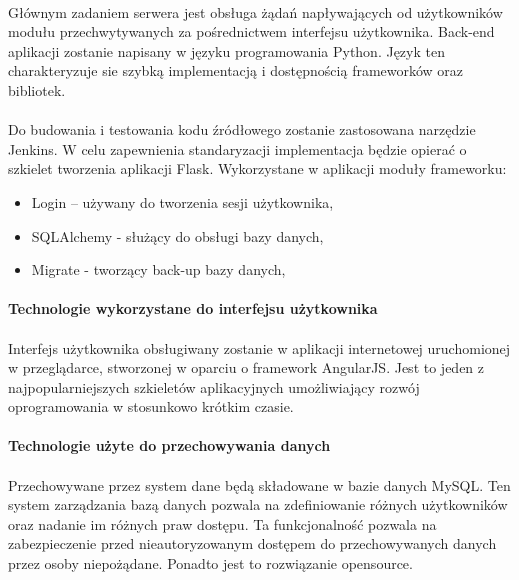\documentclass[11pt, a4paper, oneside]{report}
\begin{document}
	\paragraph{}
Głównym zadaniem serwera jest obsługa żądań napływających od użytkowników modułu przechwytywanych za pośrednictwem interfejsu użytkownika. Back-end aplikacji zostanie napisany w języku programowania Python. Język ten charakteryzuje sie szybką implementacją i dostępnością frameworków oraz bibliotek.

\paragraph{}
Do budowania i testowania kodu źródłowego zostanie zastosowana narzędzie Jenkins. W celu zapewnienia standaryzacji implementacja będzie opierać o szkielet tworzenia aplikacji Flask. Wykorzystane w aplikacji moduły frameworku:
\begin{itemize}
\item Login – używany do tworzenia sesji użytkownika,
\item SQLAlchemy - służący do obsługi bazy danych,
\item Migrate - tworzący back-up bazy danych,
\end{itemize}

\paragraph{Technologie wykorzystane do interfejsu użytkownika}
\paragraph{}
Interfejs użytkownika obsługiwany zostanie w aplikacji internetowej uruchomionej w przeglądarce, stworzonej w oparciu o framework AngularJS. Jest to jeden z najpopularniejszych szkieletów aplikacyjnych umożliwiający rozwój oprogramowania w stosunkowo krótkim czasie.

\paragraph{Technologie użyte do przechowywania danych}
\paragraph{}
Przechowywane przez system dane będą składowane w bazie danych MySQL. Ten system zarządzania bazą danych pozwala na zdefiniowanie różnych użytkowników oraz nadanie im różnych praw dostępu. Ta funkcjonalność pozwala na zabezpieczenie przed nieautoryzowanym dostępem do przechowywanych danych przez osoby niepożądane. Ponadto jest to rozwiązanie opensource.
\newpage
\end{document}
